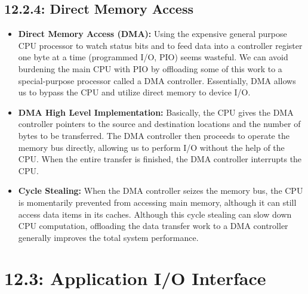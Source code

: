\documentclass[12pt]{article}
\begin{document}
\subsection*{12.2.4: Direct Memory Access}

\begin{itemize}
    \item \textbf{Direct Memory Access (DMA):} Using the expensive general purpose CPU processor to watch status bits and to feed data into a controller register one byte at a time (programmed I/O, PIO) seems wasteful. We can avoid burdening the main CPU with PIO by offloading some of this work to a special-purpose processor called a DMA controller. Essentially, DMA allows us to bypass the CPU and utilize direct memory to device I/O.
    \item \textbf{DMA High Level Implementation:} Basically, the CPU gives the DMA controller pointers to the source and destination locations and the number of bytes to be transferred. The DMA controller then proceeds to operate the memory bus directly, allowing us to perform I/O without the help of the CPU. When the entire transfer is finished, the DMA controller interrupts the CPU.
    \item \textbf{Cycle Stealing:} When the DMA controller seizes the memory bus, the CPU is momentarily prevented from accessing main memory, although it can still access data items in its caches. Although this cycle stealing can slow down CPU computation, offloading the data transfer work to a DMA controller generally improves the total system performance.
\end{itemize}

\section*{12.3: Application I/O Interface}
\end{document}

